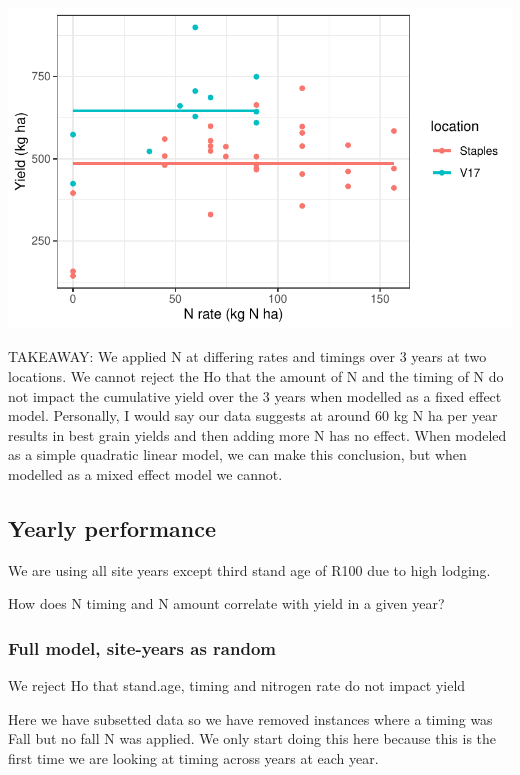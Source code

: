 \documentclass[
  letterpaper,
  DIV=11,
  numbers=noendperiod]{scrartcl}
\begin{document}
\includegraphics{nrate_draft_files/figure-pdf/unnamed-chunk-15-1.pdf}

TAKEAWAY: We applied N at differing rates and timings over 3 years at
two locations. We cannot reject the Ho that the amount of N and the
timing of N do not impact the cumulative yield over the 3 years when
modelled as a fixed effect model. Personally, I would say our data
suggests at around 60 kg N ha per year results in best grain yields and
then adding more N has no effect. When modeled as a simple quadratic
linear model, we can make this conclusion, but when modelled as a mixed
effect model we cannot.

\hypertarget{yearly-performance}{%
\subsection{Yearly performance}\label{yearly-performance}}

We are using all site years except third stand age of R100 due to high
lodging.

How does N timing and N amount correlate with yield in a given year?

\hypertarget{full-model-site-years-as-random}{%
\subsubsection{Full model, site-years as
random}\label{full-model-site-years-as-random}}

We reject Ho that stand.age, timing and nitrogen rate do not impact
yield

Here we have subsetted data so we have removed instances where a timing
was Fall but no fall N was applied. We only start doing this here
because this is the first time we are looking at timing across years at
each year.
\end{document}
